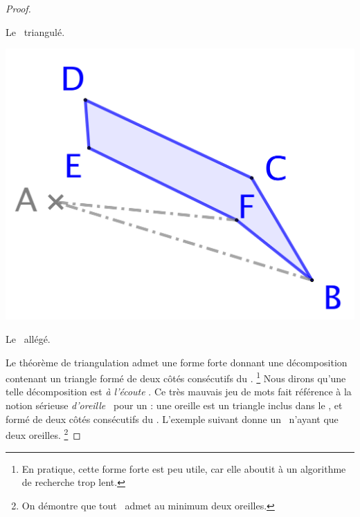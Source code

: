 \begin{proof}
\begin{multicols}{3}
\begin{center}
            \smallskip
            Le \ngone\ triangulé.
        \end{center}


        \begin{center}
            \includegraphics[scale=.35]{triangulation-3.png}

            \smallskip
            Le \ngone\ allégé.
        \end{center}
    \end{multicols}


    Le théorème de triangulation admet une forme forte donnant une décomposition contenant un triangle formé de deux côtés consécutifs du \ngone.%
    \footnote{
        En pratique, cette forme forte est peu utile, car elle aboutit à un algorithme de recherche trop lent.
    }
    Nous dirons qu'une telle décomposition est \og \emph{à l'écoute} \fg.
    Ce très mauvais jeu de mots fait référence à la notion sérieuse \og \emph{d'oreille} \fg\ pour un \ngone: une oreille est un triangle inclus dans le \ngone, et formé de deux côtés consécutifs du \ngone.
    L'exemple suivant donne un \ngone\ n'ayant que deux oreilles.%
    \footnote{
        On démontre que tout \ngone\ admet au minimum deux oreilles.
    }



\end{proof}
